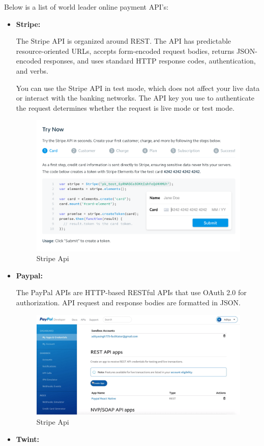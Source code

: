\begin{spacing}{1.2}
Below is a list of world leader online payment API's:
\begin{itemize}
  \item \textbf{Stripe:}
 
 The Stripe API is organized around REST. The API has predictable resource-oriented URLs, accepts form-encoded request bodies, returns JSON-encoded responses, and uses standard HTTP response codes, authentication, and verbs.

You can use the Stripe API in test mode, which does not affect your live data or interact with the banking networks. The API key you use to authenticate the request determines whether the request is live mode or test mode.

\begin{figure}[!ht]\centering
\includegraphics[scale=0.3]{stripe.png}
\caption{Stripe Api}
\label{fig:fig1}
\end{figure}

  \item \textbf{Paypal:}
  
  The PayPal APIs are HTTP-based RESTful APIs that use OAuth 2.0 for authorization. API request and response bodies are formatted in JSON.
  
\begin{figure}[!ht]\centering
\includegraphics[scale=0.3]{PayPal.png}
\caption{Stripe Api}
\label{fig:fig1}
\end{figure}
\newpage
\item \textbf{Twint:}


\end{itemize}
\end{spacing}
